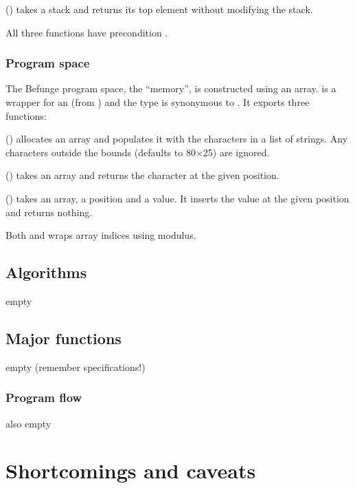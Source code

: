 \documentclass[12pt, a4paper]{article}
\begin{document}
\vspace{6pt}
\noindent
{} () takes a stack and returns its top element without modifying the stack.

\vspace{6pt}
\noindent
All three functions have precondition .

\subsubsection{Program space}
\label{sec:structmem}

The Befunge program space, the “memory”, is constructed using an array.  is a wrapper for an  (from ) and the type  is synonymous to . It exports three functions:

\vspace{6pt}
\noindent
{} () allocates an array and populates it with the characters in a list of strings. Any characters outside the bounds (defaults to 80$\times$25) are ignored.

\vspace{6pt}
\noindent
{} () takes an array and returns the character at the given position.

\vspace{6pt}
\noindent
{} () takes an array, a position and a value. It inserts the value at the given position and returns nothing.

\vspace{6pt}
\noindent
Both  and  wraps array indices using modulus.

\subsection{Algorithms}
\label{sec:algorithms}

empty

\subsection{Major functions}
\label{sec:functions}

empty (remember specifications!)

\subsubsection{Program flow}
\label{sec:flow}

also empty

\section{Shortcomings and caveats}


\vfill



\end{document}
